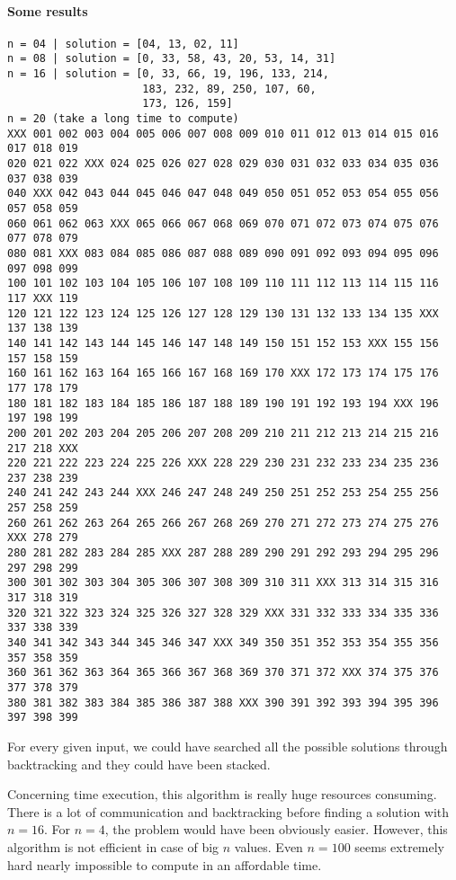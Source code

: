 \documentclass[a4paper,11pt]{article}
\begin{document}
  \paragraph{Some results}
\begin{verbatim}
n = 04 | solution = [04, 13, 02, 11]
n = 08 | solution = [0, 33, 58, 43, 20, 53, 14, 31]
n = 16 | solution = [0, 33, 66, 19, 196, 133, 214,
                     183, 232, 89, 250, 107, 60, 
                     173, 126, 159]
n = 20 (take a long time to compute)
XXX 001 002 003 004 005 006 007 008 009 010 011 012 013 014 015 016 017 018 019
020 021 022 XXX 024 025 026 027 028 029 030 031 032 033 034 035 036 037 038 039
040 XXX 042 043 044 045 046 047 048 049 050 051 052 053 054 055 056 057 058 059
060 061 062 063 XXX 065 066 067 068 069 070 071 072 073 074 075 076 077 078 079
080 081 XXX 083 084 085 086 087 088 089 090 091 092 093 094 095 096 097 098 099
100 101 102 103 104 105 106 107 108 109 110 111 112 113 114 115 116 117 XXX 119
120 121 122 123 124 125 126 127 128 129 130 131 132 133 134 135 XXX 137 138 139
140 141 142 143 144 145 146 147 148 149 150 151 152 153 XXX 155 156 157 158 159
160 161 162 163 164 165 166 167 168 169 170 XXX 172 173 174 175 176 177 178 179
180 181 182 183 184 185 186 187 188 189 190 191 192 193 194 XXX 196 197 198 199
200 201 202 203 204 205 206 207 208 209 210 211 212 213 214 215 216 217 218 XXX
220 221 222 223 224 225 226 XXX 228 229 230 231 232 233 234 235 236 237 238 239
240 241 242 243 244 XXX 246 247 248 249 250 251 252 253 254 255 256 257 258 259
260 261 262 263 264 265 266 267 268 269 270 271 272 273 274 275 276 XXX 278 279
280 281 282 283 284 285 XXX 287 288 289 290 291 292 293 294 295 296 297 298 299
300 301 302 303 304 305 306 307 308 309 310 311 XXX 313 314 315 316 317 318 319
320 321 322 323 324 325 326 327 328 329 XXX 331 332 333 334 335 336 337 338 339
340 341 342 343 344 345 346 347 XXX 349 350 351 352 353 354 355 356 357 358 359
360 361 362 363 364 365 366 367 368 369 370 371 372 XXX 374 375 376 377 378 379
380 381 382 383 384 385 386 387 388 XXX 390 391 392 393 394 395 396 397 398 399
\end{verbatim}

For every given input, we could have searched all the possible solutions through backtracking and they could
have been stacked.
  
Concerning time execution, this algorithm is really huge resources consuming. There is a lot of 
communication and backtracking before finding a solution with $n = 16$. For $n = 4$, the problem would have been obviously easier. However, this algorithm is not efficient in case of big $n$ 
values. Even $n = 100$ seems extremely hard nearly impossible to compute in an affordable 
time.
  
\end{document}
